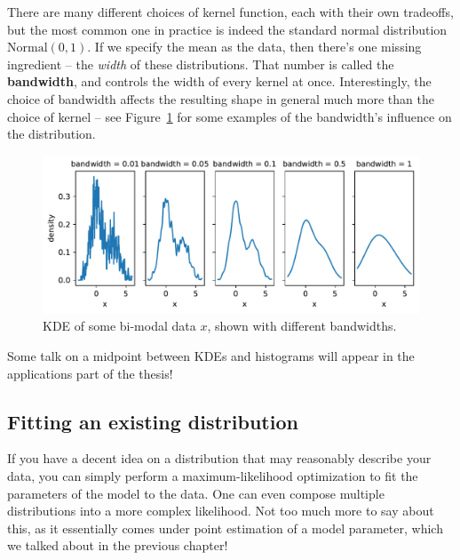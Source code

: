 \documentclass[
  11pt,
  numbers=noendperiod]{book}
\begin{document}
There are many different choices of kernel function, each with their own
tradeoffs, but the most common one in practice is indeed the standard
normal distribution \(\mathrm{Normal}(0, 1)\). If we specify the mean as
the data, then there's one missing ingredient -- the \emph{width} of
these distributions. That number is called the \textbf{bandwidth}, and
controls the width of every kernel at once. Interestingly, the choice of
bandwidth affects the resulting shape in general much more than the
choice of kernel -- see Figure~\ref{fig-kde} for some examples of the
bandwidth's influence on the distribution.

\begin{figure}

{\centering \includegraphics{./stat-practical_files/figure-pdf/fig-kde-output-1.pdf}

}

\caption{\label{fig-kde}KDE of some bi-modal data \(x\), shown with
different bandwidths.}

\end{figure}

Some talk on a midpoint between KDEs and histograms will appear in the
applications part of the thesis!

\hypertarget{fitting-an-existing-distribution}{%
\subsection{Fitting an existing
distribution}\label{fitting-an-existing-distribution}}

If you have a decent idea on a distribution that may reasonably describe
your data, you can simply perform a maximum-likelihood optimization to
fit the parameters of the model to the data. One can even compose
multiple distributions into a more complex likelihood. Not too much more
to say about this, as it essentially comes under point estimation of a
model parameter, which we talked about in the previous chapter!
\end{document}
